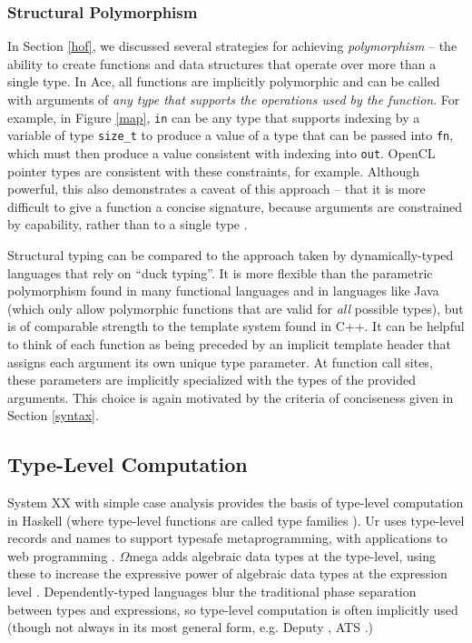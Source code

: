 \documentclass{sig-alternate}
\begin{document}
\subsubsection{Structural Polymorphism}
In Section \ref{hof}, we discussed several strategies for achieving {\it polymorphism} -- the ability to create functions and data structures that operate over more than a single type. In Ace, all functions are implicitly polymorphic and can be called with arguments of {\it any type that supports the operations used by the function}. For example, in Figure \ref{map}, \verb|in| can be any type that supports indexing by a variable of type \verb|size_t| to produce a value of a type that can be passed into \verb|fn|, which must then produce a value consistent with indexing into \verb|out|. OpenCL pointer types are consistent with these constraints, for example. Although powerful, this also demonstrates a caveat of this approach -- that it is more difficult to give a function a concise signature, because arguments are constrained by capability, rather than to a single type \cite{malayeri2009structural}.

Structural typing can be compared to the approach taken by dynamically-typed languages that rely on ``duck typing''. It is more flexible than the parametric polymorphism found in many functional languages and in languages like Java (which only allow polymorphic functions that are valid for {\it all} possible types), but is of comparable strength to the template system found in C++. It can be helpful to think of each function as being preceded by an implicit template header that assigns each argument its own unique type parameter. At function call sites, these parameters are implicitly specialized with the types of the provided arguments. This choice is again motivated by the criteria of conciseness given in Section \ref{syntax}.

\subsection{Type-Level Computation} %
System XX with simple case analysis provides the basis of type-level computation in Haskell (where type-level functions are called type families \cite{Chakravarty:2005:ATC}). Ur uses type-level records and names to support typesafe metaprogramming, with applications to web programming \cite{conf/pldi/Chlipala10}. $\Omega$mega adds algebraic data types at the type-level, using these to increase the expressive power of algebraic data types at the expression level \cite{conf/cefp/SheardL07}. Dependently-typed languages blur the traditional phase separation between types and expressions, so type-level computation is often implicitly used (though not always in its most general form, e.g. Deputy \cite{conf/icfp/ChenX05}, ATS \cite{conf/esop/ConditHAGN07}.)
\end{document}

